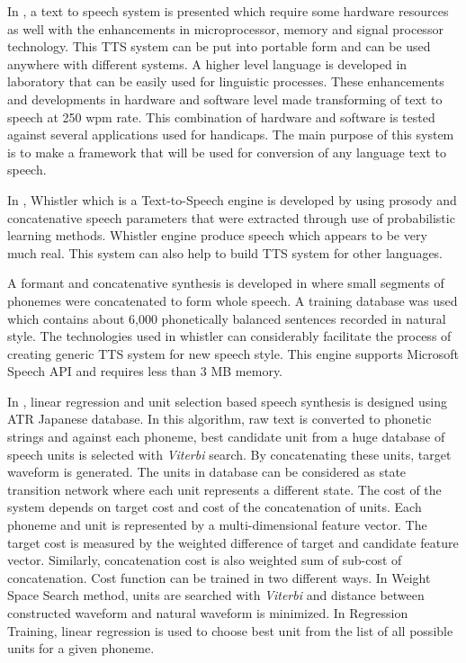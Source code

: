 In \cite{carlson1982multi}, a text to speech system is presented which require some hardware resources as well with the enhancements in microprocessor, 
memory and signal processor technology. This TTS system can be put into portable form and can be used anywhere with different systems. A higher level language is
developed in laboratory that can be easily used for linguistic processes. These enhancements and developments in hardware
and software level made transforming of text to speech at 250 wpm rate. This combination of hardware and software is tested
against several applications used for handicaps. The main purpose of this system is to make a framework that will
be used for conversion of any language text to speech. 

In \cite{huang1996whistler}, Whistler which is a Text-to-Speech engine is developed by using prosody and
concatenative speech parameters that were extracted through use of probabilistic learning methods. Whistler engine produce
speech which appears to be very much real. This system can also help to build TTS system for other languages.

A formant and concatenative synthesis is developed in \cite{huang1997recent}
where small segments of phonemes were concatenated to form whole speech. A training database was used which 
contains about 6,000 phonetically balanced sentences recorded in natural style. The technologies used in whistler can considerably facilitate the
process of creating generic TTS system for new speech style. This engine supports Microsoft Speech API \cite{ms_speech_api} and requires less than 3 MB memory.

In \cite{hunt1996unit}, linear regression and unit selection 
based speech synthesis is designed using ATR Japanese database. In this algorithm, raw text is converted to phonetic strings and against each phoneme, best candidate unit from a huge database of speech units is selected with \textit{Viterbi} search. By concatenating these units, target waveform is generated. The units in database can be considered as state transition network where each unit represents a different state. The cost of the system depends on target cost and cost of the concatenation of units. Each phoneme and unit is represented by a multi-dimensional feature vector. The target cost is measured by the weighted difference of target and candidate feature vector. Similarly, concatenation cost is also weighted sum of sub-cost of concatenation. Cost function can be trained in two different ways. In Weight Space Search method, units are searched with \textit{Viterbi} and distance between constructed waveform and
natural waveform is minimized. In Regression Training, linear regression is used to choose best unit from the list of all possible
units for a given phoneme. 

